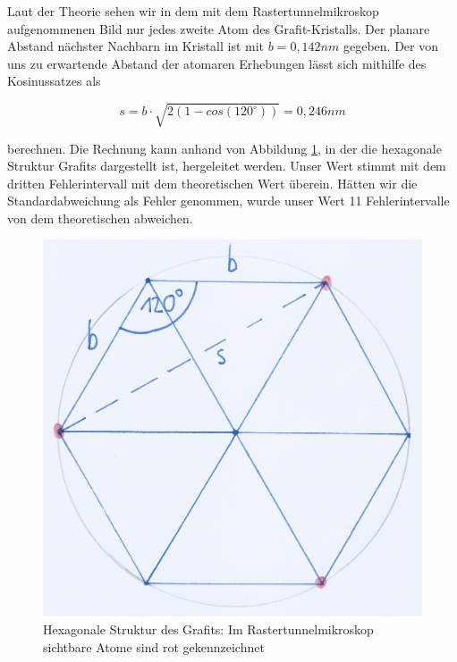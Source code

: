 \documentclass[10pt,a4paper]{article}
\begin{document}
Laut der Theorie sehen wir in dem mit dem Rastertunnelmikroskop aufgenommenen Bild nur jedes zweite Atom des Grafit-Kristalls. Der planare Abstand nächster Nachbarn im Kristall ist mit $b = 0,142 nm$ gegeben. Der von uns zu erwartende Abstand der atomaren Erhebungen lässt sich mithilfe des Kosinussatzes als 

\begin{equation}
	s = b \cdot \sqrt{2(1-cos(120^\circ))} = 0,246 nm
	\label{eq:aabstand}
\end{equation}

berechnen. Die Rechnung kann anhand von Abbildung \ref{rechnungatomabstand}, in der die hexagonale Struktur Grafits dargestellt ist, hergeleitet werden. Unser Wert stimmt mit dem dritten Fehlerintervall mit dem theoretischen Wert überein. Hätten wir die Standardabweichung als Fehler genommen, wurde unser Wert 11 Fehlerintervalle von dem theoretischen abweichen.

\begin{figure}[h]
	\centering
	
	\includegraphics[scale = 0.4]{hexagon.jpg}
	
	\caption{Hexagonale Struktur des Grafits: Im Rastertunnelmikroskop sichtbare Atome sind rot gekennzeichnet}
	\label{rechnungatomabstand}
\end{figure}
\end{document}
